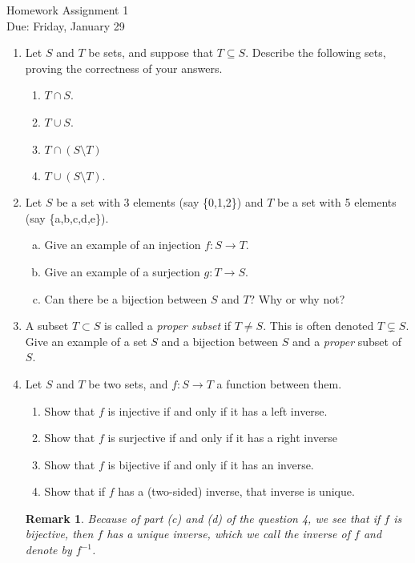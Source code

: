 \documentclass[11pt]{article}
\newtheorem*{remark}{Remark}
\begin{document}
\begin{center}
\Large {Homework Assignment 1}\\
\small {Due: Friday, January 29}
\end{center}
\begin{enumerate}
\item{
  Let $S$ and $T$ be sets, and suppose that $T\subseteq S$.  Describe the following sets, proving the correctness of your answers.
  \begin{enumerate}
    \item{
    $T\cap S$.
    }
    \item{
    $T\cup S$.
    }
    \item{
    $T\cap(S\setminus T)$
    }
    \item{
    $T\cup(S\setminus T)$.
    }
  \end{enumerate}
}
\item Let $S$ be a set with 3 elements (say \{0,1,2\}) and $T$ be a set with 5 elements (say \{a,b,c,d,e\}).
\begin{enumerate}[(a)]
\item Give an example of an injection $f:S\to T$.
\item Give an example of a surjection $g:T\to S$.
\item Can there be a bijection between $S$ and $T$? Why or why not?
\end{enumerate}
\item A subset $T\subset S$ is called a \textit{proper subset} if $T\not= S$.  This is often denoted $T\subsetneq S$.  Give an example of a set $S$ and a bijection between $S$ and a \textit{proper} subset of $S$.
\item Let $S$ and $T$ be two sets, and $f:S\to T$ a function between them.
\begin{enumerate}
  \item{Show that $f$ is injective if and only if it has a left inverse.}
  \item{Show that $f$ is surjective if and only if it has a right inverse}
  \item{Show that $f$ is bijective if and only if it has an inverse.}
  \item{Show that if $f$ has a (two-sided) inverse, that inverse is unique.}
\end{enumerate}
\begin{remark}
  Because of part (c) and (d) of the question 4, we see that if $f$ is bijective, then $f$ has a unique inverse, which we call \textit{the inverse of $f$} and denote by $f^{-1}$.

\end{remark}
\end{enumerate}
\end{document}
